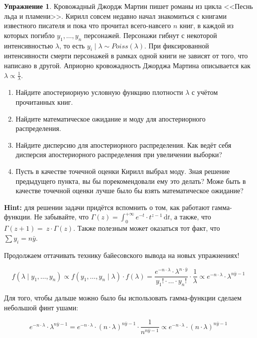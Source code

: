 \documentclass[12pt, a4paper, oneside]{extreport}
\newcommand{\dx}[1]{\,\mathrm{d}#1} %
\theoremstyle{plain}              %
\theoremstyle{definition}         %
\newtheorem{problem}{\color{myblue} Упражнение}
\begin{document}
\begin{problem}
Кровожадный Джордж Мартин пишет романы из цикла <<Песнь льда и пламени>>. Кирилл совсем недавно начал знакомиться с книгами известного писателя и пока что прочитал всего-навсего $n$ книг, в каждой из которых погибло $y_1, \ldots, y_n$ персонажей. Персонажи гибнут с некоторой интенсивностью $\lambda$, то есть  $y_i \mid \lambda \sim Poiss(\lambda)$. При фиксированной интенсивности смерти персонажей в рамках одной книги не зависят от того, что написано в другой. Априорно кровожадность Джорджа Мартина описывается как $\lambda \propto \frac{1}{\lambda}$.

\begin{enumerate}
\item Найдите апостериорную условную функцию плотности $\lambda$ с учётом прочитанных книг.
\item Найдите математическое ожидание и моду для апостериорного распределения.
\item Найдите дисперсию для апостериорного распределения. Как ведёт себя дисперсия апостериорного распределения при увеличении выборки? 
\item Пусть в качестве точечной оценки Кирилл выбрал моду. Зная решение предыдущего пункта, вы бы порекомендовали ему это делать? Може быть в качестве точечной оценки лучше было бы взять математическое ожидание?
\end{enumerate}

\textbf{Hint:} для решении задачи придётся вспомнить о том, как работают гамма-функции. Не забывайте, что $ \Gamma(z) = \int_0^{+\infty} e^{-t} \cdot t^{z-1} \dx{t}$, а также, что $\Gamma(z+1) = \ z \cdot \Gamma(z)$. Также полезным может оказаться тот факт, что $\sum y_i = n \bar y$.

\begin{sol}

Продолжаем оттачивать технику байесовского вывода на новых упражнениях!

\[ f(\lambda \mid y_1, \ldots, y_n) \propto f(y_1, \dots, y_n \mid \lambda) \cdot f(\lambda) = \frac{e^{-n \cdot \lambda} \cdot \lambda^{n \cdot \bar y}}{y_1! \cdot \ldots \cdot y_n!} \cdot \frac{1}{\lambda} \propto e^{-n \cdot \lambda} \cdot \lambda^{n \bar y - 1} \]

Для того, чтобы дальше можно было бы использовать гамма-функции сделаем небольшой финт ушами:

\[ e^{-n \cdot \lambda} \cdot \lambda^{n \bar y - 1} = e^{-n \cdot \lambda} \cdot (n \cdot\lambda)^{n \bar y - 1} \cdot \frac{1}{n^{n \bar y - 1}} \propto e^{-n \cdot \lambda} \cdot (n \cdot\lambda)^{n \bar y - 1} \]


\end{sol}
\end{problem}
\end{document}

